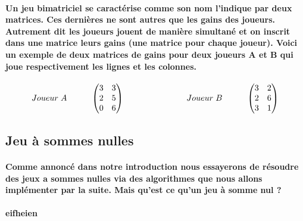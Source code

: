\documentclass[a4paper, 12pt, twoside]{article}
\begin{document}
\paragraph{Un jeu bimatriciel se caractérise comme son nom l'indique par deux matrices. Ces dernières ne sont autres que les gains des joueurs. Autrement dit les joueurs jouent de manière simultané et on inscrit dans une matrice leurs gains (une matrice pour chaque joueur). Voici un exemple de deux matrices de gains pour deux joueurs A et B qui joue respectivement les lignes et les colonnes.}

\[
Joueur\hspace{0,1cm} A\hspace{1cm}
\begin{pmatrix}3&3\\
2&5\\
0&6\\
\end{pmatrix}\                      \hspace{2,5cm}  
Joueur\hspace{0,1cm} B \hspace{1cm}  
\begin{pmatrix}3&2\\
2&6\\
3&1\\
\end{pmatrix} 
\]
\subsection{Jeu à sommes nulles}
\paragraph{Comme annoncé dans notre introduction nous essayerons de résoudre des jeux a sommes nulles via des algorithmes que nous allons implémenter par la suite. Mais qu'est ce qu'un jeu à somme nul ? }
\paragraph{eifheien}




\newpage
\end{document}

